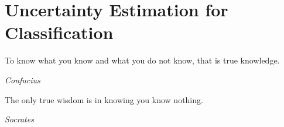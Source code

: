 \chapter{Uncertainty Estimation for Classification}
\label{chap:classification}

\epigraph{To know what you know and what you do not know, that is true knowledge.}{\textit{Confucius}}

\epigraph{The only true wisdom is in knowing you know nothing.}{\textit{Socrates}}








